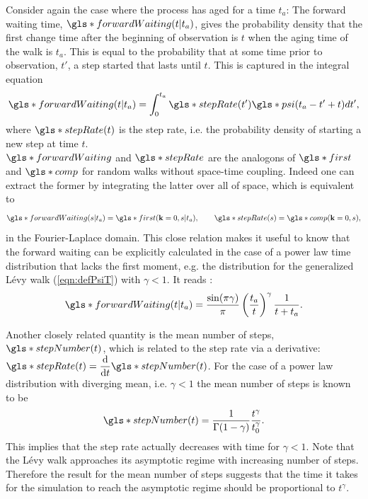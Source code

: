 Consider again the case where the process has aged for a time $t_a$: The forward waiting time, $\gls*{forwardWaiting}(t|t_a)$, gives the probability density that the first change time after the beginning of observation is $t$ when the aging time of the walk is $t_a$. This is equal to the probability that at some time prior to observation, $t'$, a step started that lasts until $t$. This is captured in the integral equation 
%
\begin{align}
\gls*{forwardWaiting}(t|t_a) = \int^{t_a}_{0} \gls*{stepRate}(t') \gls*{psi}(t_a-t'+t) dt',
\end{align}
%
where $\gls*{stepRate}(t)$ is the step rate, i.e. the probability density of starting a new step at time $t$. \\
$\gls*{forwardWaiting}$ and $\gls*{stepRate}$ are the analogons of $\gls*{first}$ and $\gls*{comp}$ for random walks without space-time coupling. Indeed one can extract the former by integrating the latter over all of space, which is equivalent to
%
\begin{align}
\gls*{forwardWaiting}(s|t_a) = \gls*{first}(\ve{k}=0,s|t_a), \qquad \gls*{stepRate}(s) = \gls*{comp}(\ve{k}=0,s)  ,
\end{align}
%
in the Fourier-Laplace domain. This close relation makes it useful to know that the forward waiting can be explicitly calculated in the case of a power law time distribution that lacks the first moment, e.g. the distribution for the generalized L\'evy walk (\ref{eqn:defPsiT}) with $\gamma < 1$.  It reads 
\cite{firstSteps}:
%
\begin{align}
\gls*{forwardWaiting}(t|t_a) = \frac{\sin(\pi \gamma)}{\pi} \left( \frac{t_a}{t} \right)^{\gamma} \frac{1}{t+t_a} \label{eqn:forwardWaiting} .
\end{align}

Another closely related quantity is the mean number of steps, $\gls*{stepNumber} (t)$, which is related to the step rate via a derivative: $\gls*{stepRate}(t) = \der{}{t} \gls*{stepNumber} (t)$. For the case of a power law distribution with diverging mean, i.e. $\gamma <1$ the mean number of steps is known to be 
\cite{firstSteps}
%
\begin{align}
\gls*{stepNumber} (t) = \frac{1}{\Gamma(1-\gamma)} \frac{t^{\gamma}}{t_0^{\gamma}} . 
\end{align}
%
This implies that the step rate actually decreases with time for $\gamma < 1$. Note that the L\'evy walk approaches its asymptotic regime with increasing number of steps. Therefore the result for the mean number of steps suggests that the time it takes for the simulation to reach the asymptotic regime should be proportional to $t^{\gamma}$.


